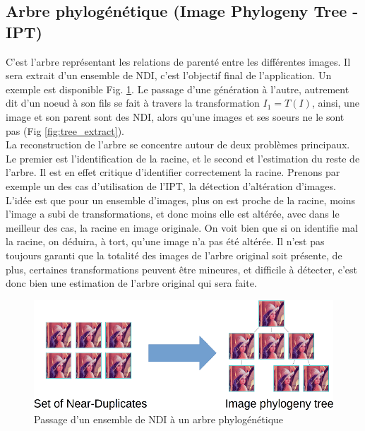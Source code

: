 \documentclass[utf8]{stageM2R} %
\begin{document}
\subsection{Arbre phylogénétique (Image Phylogeny Tree - IPT)}
C'est l'arbre représentant les relations de parenté entre les différentes images. Il sera extrait d'un ensemble de NDI, c'est l'objectif final de l'application. Un exemple est disponible Fig. \ref{fig:set_to_tree}. Le passage d'une génération à l'autre, autrement dit d'un noeud à son fils se fait à travers la transformation $I_{1} = T(I)$, ainsi, une image et son parent sont des NDI, alors qu'une images et ses soeurs ne le sont pas (Fig \ref{fig:tree_extract}).
\\ \indent
La reconstruction de l'arbre se concentre autour de deux problèmes principaux. Le premier est l'identification de la racine, et le second et l'estimation du reste de l'arbre. Il est en effet critique d'identifier correctement la racine. Prenons par exemple un des cas d'utilisation de l'IPT, la détection d'altération d'images. L'idée est que pour un ensemble d'images, plus on est proche de la racine, moins l'image a subi de transformations, et donc moins elle est altérée, avec dans le meilleur des cas, la racine en image originale. On voit bien que si on identifie mal la racine, on déduira, à tort, qu'une image n'a pas été altérée. Il n'est pas toujours garanti que la totalité des images de l'arbre original soit présente, de plus, certaines transformations peuvent être mineures, et difficile à détecter, c'est donc bien une estimation de l'arbre original qui sera faite.

\begin{figure}
  \begin{center}
    \includegraphics[width=120mm]{images/set_to_tree}
    \caption{Passage d'un ensemble de NDI à un arbre phylogénétique}
    \label{fig:set_to_tree}
  \end{center}
\end{figure}
\end{document}
